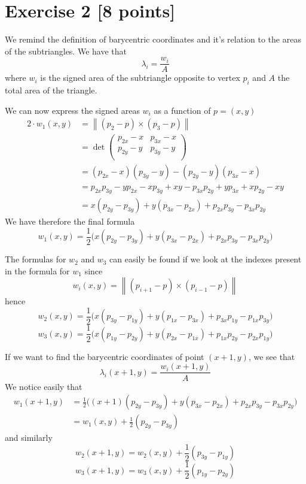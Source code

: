\documentclass[a4paper, 11pt]{article}
\begin{document}
\section*{Exercise 2 [8 points]}

We remind the definition of barycentric coordinates and it's relation to the
areas of the subtriangles.
We have that
$$ \lambda_i = \frac{w_i}{A} $$
where $w_i$ is the signed area of the subtriangle opposite to vertex $p_i$ and
$A$ the total area of the triangle.

We can now express the signed areas $w_i$ as a function of $p = (x, y)$
\begin{align*}
	2 \cdot w_1(x, y) & = \left\| ( p_{2} - p ) \times ( p_{3} - p ) \right\|     \\
	                  & = \det \begin{pmatrix}
		                           p_{2x} - x & p_{3x} - x \\
		                           p_{2y} - y & p_{3y} - y \\
	                           \end{pmatrix}                            \\
	                  & = (p_{2x} - x ) (p_{3y} - y) - (p_{2y} - y) (p_{3x} - x)  \\
	                  & = p_{2x}p_{3y} - y p_{2x} - xp_{3y} + xy - p_{3x}p_{2y} +
	y p_{3x} + xp_{2y} - xy                                                       \\
	                  & = x(p_{2y} - p_{3y})  + y (p_{3x} - p_{2x}) +
	p_{2x}p_{3y} - p_{3x}p_{2y}
\end{align*}
We have therefore the final formula
$$ w_1(x, y) =  \frac{1}{2} \bigl(x(p_{2y} - p_{3y})  + y (p_{3x} - p_{2x}) + p_{2x}p_{3y} - p_{3x}p_{2y}\bigr)$$

The formulas for $w_2$ and $w_3$ can easily be found if we look at the indexes
present in the formula for $w_1$ since
$$ w_i(x, y) = \left\| ( p_{i+1} - p ) \times ( p_{i-1} - p ) \right\|$$
hence
$$ w_2(x, y) =  \frac{1}{2} \bigl(x(p_{3y} - p_{1y})  + y (p_{1x} - p_{3x}) + p_{3x}p_{1y} - p_{1x}p_{3y}\bigr)$$
$$ w_3(x, y) =  \frac{1}{2} \bigl(x(p_{1y} - p_{2y})  + y (p_{2x} - p_{1x}) + p_{1x}p_{2y} - p_{2x}p_{1y}\bigr)$$

If we want to find the barycentric coordinates of point $(x + 1, y)$, we see that
$$ \lambda_i(x + 1, y) = \frac{w_i(x+1, y)}{A} $$
We notice easily that
\begin{align*}
	w_1(x+1, y) & =
	\frac{1}{2} \bigl((x+1)(p_{2y} - p_{3y})  + y (p_{3x} - p_{2x}) +
	p_{2x}p_{3y} - p_{3x}p_{2y}\bigr)                         \\
	            & = w_1(x, y) + \frac{1}{2} (p_{2y} - p_{3y})
\end{align*}
and similarly
$$ w_2(x + 1, y) =  w_2(x, y) + \frac{1}{2} (p_{3y} - p_{1y})$$
$$ w_3(x + 1, y) = w_3(x, y) + \frac{1}{2} (p_{1y} - p_{2y})$$
\end{document}
